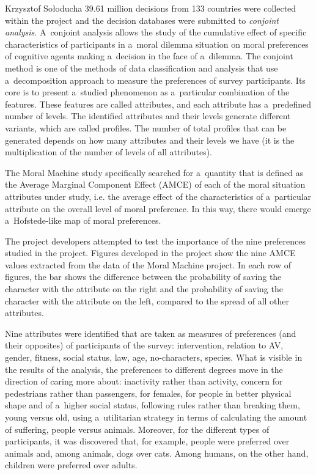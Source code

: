 \begin{artengenv}{Krzysztof Sołoducha}
39.61 million decisions from 133 countries were collected within the project and the decision databases were submitted to \textit{conjoint analysis}. A~conjoint analysis allows the study of the cumulative effect of specific characteristics of participants in a~moral dilemma situation on moral preferences of cognitive agents making a~decision in the face of a~dilemma. The conjoint method is one of the methods of data classification and analysis that use a~decomposition approach to measure the preferences of survey participants. Its core is to present a~studied phenomenon as a~particular combination of the features. These features are called attributes, and each attribute has a~predefined number of levels. The identified attributes and their levels generate different variants, which are called profiles. The number of total profiles that can be generated depends on how many attributes and their levels we have (it is the multiplication of the number of levels of all attributes).

The Moral Machine study specifically searched for a~quantity that is defined as the Average Marginal Component Effect (AMCE) of each of the moral situation attributes under study, i.e. the average effect of the characteristics of a~particular attribute on the overall level of moral preference. In this way, there would emerge a~Hofstede-like map of moral preferences.

The project developers attempted to test the importance of the nine preferences studied in the project. Figures developed in the project show the nine AMCE values extracted from the data of the Moral Machine project. In each row of figures, the bar shows the difference between the probability of saving the character with the attribute on the right and the probability of saving the character with the attribute on the left, compared to the spread of all other attributes.

Nine attributes were identified that are taken as measures of preferences (and their opposites) of participants of the survey: intervention, relation to AV, gender, fitness, social status, law, age, no-characters, species. What is visible in the results of the analysis, the preferences to different degrees move in the direction of caring more about: inactivity rather than activity, concern for pedestrians rather than passengers, for females, for people in better physical shape and of a~higher social status, following rules rather than breaking them, young versus old, using a~utilitarian strategy in terms of calculating the amount of suffering, people versus animals. Moreover, for the different types of participants, it was discovered that, for example, people were preferred over animals and, among animals, dogs over cats. Among humans, on the other hand, children were preferred over adults.


\end{artengenv}
